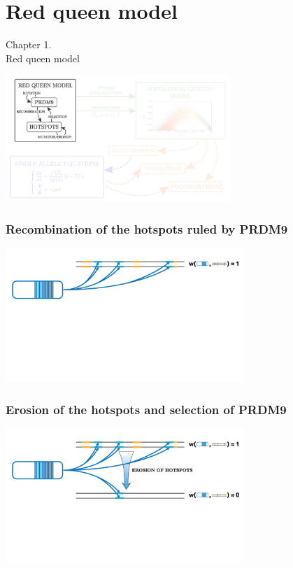 \documentclass[10pt]{beamer}
\begin{document}
\section{Red queen model}

\begin{frame}
	\begin{center}
	\huge
	Chapter 1. \\
       Red queen model
	\end{center}
\end{frame}

\begin{frame}
	\begin{center}
       \includegraphics[width=8.5cm]{Images/overline-1.png}
	\end{center}
\end{frame}

\begin{frame}
\frametitle{Recombination of the hotspots ruled by PRDM9}
	\begin{center}
       \includegraphics[width=9cm]{Images/RedQueen-1.png}
	\end{center}
\end{frame}

\begin{frame}
\frametitle{Erosion of the hotspots and selection of PRDM9}
	\begin{center}
       \includegraphics[width=9cm]{Images/RedQueen-2.png}
	\end{center}
\end{frame}
\end{document}
